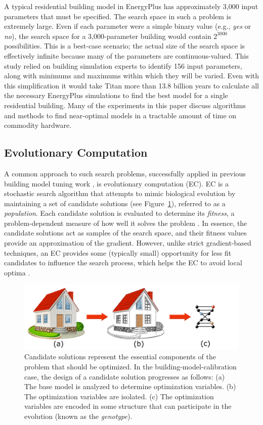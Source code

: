\documentclass[preprint, review, 12pt]{elsarticle}
\begin{document}
A typical residential building model in EnergyPlus has approximately 3,000 input parameters that must be specified. The search space in such a problem is extremely large. Even if each parameter were a simple binary value (e.g., \emph{yes} or \emph{no}), the search space for a 3,000-parameter building would contain $2^{3000}$ possibilities. This is a best-case scenario; the actual size of the search space is effectively infinite because many of the parameters are continuous-valued. This study relied on building simulation experts to identify 156 input parameters, along with minimums and maximums within which they will be varied. Even with this simplification it would take Titan more than 13.8 billion years to calculate all the necessary EnergyPlus simulations to find the best model for a single residential building. Many of the experiments in this paper discuss algorithms and methods to find near-optimal models in a tractable amount of time on commodity hardware.

\subsection{Evolutionary Computation}
A common approach to such search problems, successfully applied in previous building model tuning work \cite{cit:garrett2013}, is evolutionary computation (EC). EC \cite{cit:dejong1993,cit:spears1993,cit:fogel1994,cit:fogel2000} is a stochastic search algorithm that attempts to mimic biological evolution by maintaining a set of candidate solutions (see Figure~\ref{fig:chromosome}), referred to as a \emph{population}. Each candidate solution is evaluated to determine its \emph{fitness}, a problem-dependent measure of how well it solves the problem \cite{cit:dejong2006}. In essence, the candidate solutions act as samples of the search space, and their fitness values provide an approximation of the gradient. However, unlike strict gradient-based techniques, an EC provides some (typically small) opportunity for less fit candidates to influence the search process, which helps the EC to avoid local optima \cite{cit:michalewicz2004}. 

\begin{figure}[htbp]
\centering
\includegraphics[width=5in]{graphics/autotune_chromosome}
\caption{Candidate solutions represent the essential components of the problem that should be optimized. In the building-model-calibration case, the design of a candidate solution progresses as follows: 
(a) The base model is analyzed to determine optimization variables.
(b) The optimization variables are isolated.
(c) The optimization variables are encoded in some structure that can participate in the evolution (known as the \emph{genotype}).}
\label{fig:chromosome}
\end{figure}
\end{document}
